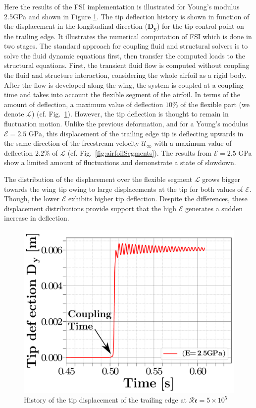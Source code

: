\documentclass[conf]{new-aiaa}
\newcommand{\Rey}{\mathcal{R}\mathfrak{e}}
\begin{document}
Here the results of the FSI implementation is illustrated for Young's modulus 2.5GPa and shown in Figure \ref{fig:youngEffect}.
%
The tip deflection history is shown in function of the displacement in the longitudinal direction ($\boldsymbol{D_y}$) for the tip control point on the trailing edge.
%
It illustrates the numerical computation of FSI which is done in two stages.
%
The standard approach for coupling fluid and structural solvers is to solve the fluid dynamic equations first, then transfer the computed loads to the structural equations.
%
First, the transient fluid flow is computed without coupling the fluid and structure interaction, considering the whole airfoil as a rigid body.
%
After the flow is developed along the wing, the system is coupled at a coupling time and takes into account the flexible segment of the airfoil.
%
In terms of the amount of deflection, a maximum value of deflection $10\%$ of the flexible part (we denote $\mathcal{L}$) (cf. Fig.~\ref{fig:youngEffect}).
%
However, the tip deflection is thought to remain in fluctuation motion.
%
Unlike the previous deformation, and for a Young's modulus $\mathcal{E}=2.5$ GPa, this displacement of the trailing edge tip is deflecting upwards in the same direction of the freestream velocity $\mathcal{U}_\infty$ with a maximum value of deflection $2.2\%$ of $\mathcal{L}$ (cf. Fig.~\ref{fig:airfoilSegments}).
%
The results from $\mathcal{E}=2.5$ GPa show a limited amount of fluctuations and demonstrate a state of slowdown.


The distribution of the displacement over the flexible segment $\mathcal{L}$ grows bigger towards the wing tip owing to large displacements at the tip for both values of $\mathcal{E}$.
%
Though, the lower $\mathcal{E}$ exhibits higher tip deflection.
%
Despite the differences, these displacement distributions provide support that the high $\mathcal{E}$ generates a sudden increase in deflection.


\begin{figure}[ht!]
\centering

\includegraphics[width=0.5\columnwidth]{figs/deflectionvariousYoungs0.pdf}
\caption{ History of the tip displacement of the trailing edge at $\Rey =5\times10^5$ }
\label{fig:youngEffect}
\end{figure}
\end{document}

